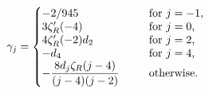 \begin{equation}
    \label{gammascircle}
    \gamma_j=
    \left\{
    \begin{minipage}[c]{9cm}
        \begin{tabbing}
            ${-2/945}$   \=\qquad\=\qquad\=\qquad
            {\rm for}          $j=-1$,\\
            $3 \zeta_R'(-4)$ \>\qquad\>\qquad\>\qquad
            {\rm for}                  $j=0$,\\
            $4\zeta_R'(-2)d_2$ \>\qquad\>\qquad\>\qquad
            {\rm for}          $j=2$,\\
            $-d_4 $ \>\qquad\>\qquad\>\qquad
            {\rm for}
              $j=4$,\\
            $\displaystyle -{8 d_j \zeta_R(j-4) \over (j-4)(j-2)}$
            \>\qquad\>\qquad\>\qquad \rm{otherwise}.
        \end{tabbing}
    \end{minipage}
\right.
\end{equation}

